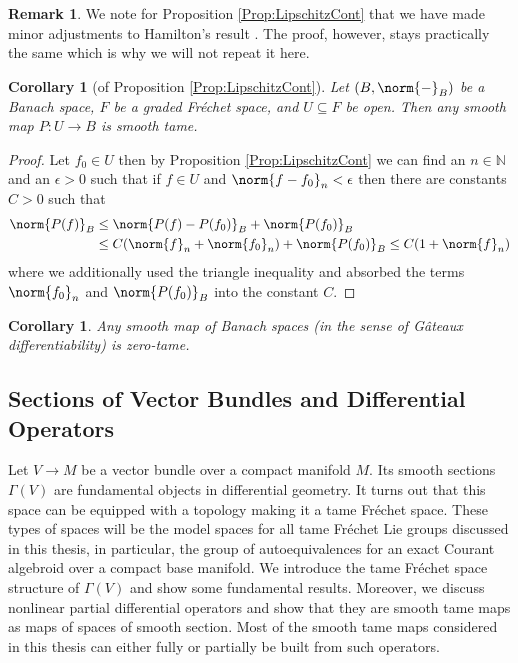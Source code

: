 \documentclass[12pt,a4paper]{article}
\theoremstyle{plain}
\newtheorem{corollary}[theorem]{Corollary}
\theoremstyle{definition}
\newtheorem{remark}[theorem]{Remark}
\newcommand{\N}{\mathbb{N}}
\newcommand{\nnorm}[2]{\norm{#1}_{#2}}
\begin{document}
\begin{remark}
We note for Proposition \ref{Prop:LipschitzCont} that we have made minor adjustments to Hamilton's result \cite[Part I, Theorem 5.1.3]{hamilton}. The proof, however, stays practically the same which is why we will not repeat it here.
\end{remark}


\begin{corollary}[of Proposition \ref{Prop:LipschitzCont}]
\label{Cor:SmToBanSmTame}
Let $(B,\nnorm{-}{B})$ be a Banach space, $F$ be a graded Fréchet space, and $U\subseteq F$ be open. Then any smooth map $P:U\to B$ is smooth tame.
\end{corollary}
\begin{proof}
Let $f_0\in U$ then by Proposition \ref{Prop:LipschitzCont} we can find an $n\in \N$ and an $\epsilon>0$ such that if $f\in U$ and $\nnorm{f-f_0}{n}<\epsilon$ then there are constants $C>0$ such that
\begin{align*}
    \nnorm{P(f)}{B}&\leq \nnorm{P(f)-P(f_0)}{B}+\nnorm{P(f_0)}{B}\\
    &\leq C(\nnorm{f}{n}+\nnorm{f_0}{n})+\nnorm{P(f_0)}{B}\leq C(1+\nnorm{f}{n})
\end{align*}
where we additionally used the triangle inequality and absorbed the terms $\nnorm{f_0}{n}$ and $\nnorm{P(f_0)}{B}$ into the constant $C$.
\end{proof}

\begin{corollary}
\label{Cor:MapsOfBanachSpacesZeroTame}
Any smooth map of Banach spaces (in the sense of Gâteaux differentiability) is zero-tame.
\end{corollary}


\subsection{Sections of Vector Bundles and Differential Operators}
\label{Section:SectionsOfVBsAndDiffOps}

Let $V\to M$ be a vector bundle over a compact manifold $M$. Its smooth sections $\Gamma(V)$ are fundamental objects in differential geometry. It turns out that this space can be equipped with a topology making it a tame Fréchet space. These types of spaces will be the model spaces for all tame Fréchet Lie groups discussed in this thesis, in particular, the group of autoequivalences for an exact Courant algebroid over a compact base manifold. We introduce the tame Fréchet space structure of $\Gamma(V)$ and show some fundamental results.
Moreover, we discuss nonlinear partial differential operators and show that they are smooth tame maps as maps of spaces of smooth section. Most of the smooth tame maps considered in this thesis can either fully or partially be built from such operators.
\end{document}
